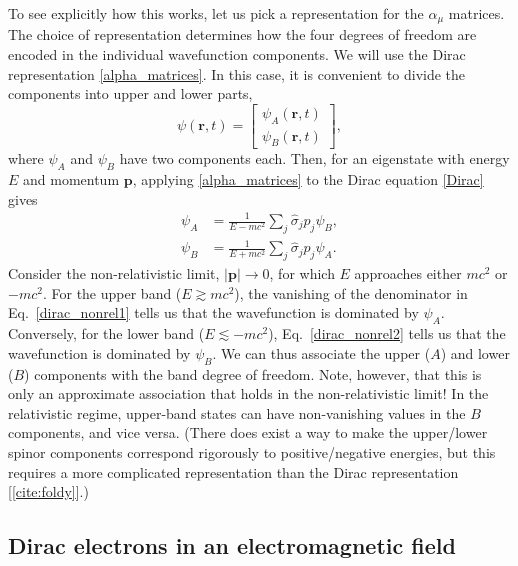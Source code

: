\documentclass[pra,12pt]{revtex4}
\begin{document}
To see explicitly how this works, let us pick a representation for the
$\hat{\alpha}_\mu$ matrices.  The choice of representation determines
how the four degrees of freedom are encoded in the individual
wavefunction components.  We will use the Dirac representation
\eqref{alpha_matrices}.  In this case, it is convenient to divide the
components into upper and lower parts,
\begin{equation}
  \psi(\mathbf{r},t) = \begin{bmatrix}\psi_A(\mathbf{r},t)
    \\ \psi_B(\mathbf{r},t)
  \end{bmatrix},
\end{equation}
where $\psi_A$ and $\psi_B$ have two components each.  Then, for an
eigenstate with energy $E$ and momentum $\mathbf{p}$, applying
\eqref{alpha_matrices} to the Dirac equation \eqref{Dirac} gives
\begin{align}
  \psi_A &= \frac{1}{E - mc^2} \sum_j \hat{\sigma}_j p_j \psi_B,
  \label{dirac_nonrel1} \\
  \psi_B &= \frac{1}{E + mc^2} \sum_j \hat{\sigma}_j p_j \psi_A.
  \label{dirac_nonrel2}
\end{align}
Consider the non-relativistic limit, $|\mathbf{p}| \rightarrow 0$, for
which $E$ approaches either $mc^2$ or $-mc^2$.  For the upper band ($E
\gtrsim mc^2$), the vanishing of the denominator in
Eq.~\eqref{dirac_nonrel1} tells us that the wavefunction is dominated
by $\psi_A$.  Conversely, for the lower band ($E \lesssim -mc^2$),
Eq.~\eqref{dirac_nonrel2} tells us that the wavefunction is dominated
by $\psi_B$.  We can thus associate the upper ($A$) and lower ($B$)
components with the band degree of freedom.  Note, however, that this
is only an approximate association that holds in the non-relativistic
limit!  In the relativistic regime, upper-band states can have
non-vanishing values in the $B$ components, and vice versa.  (There
does exist a way to make the upper/lower spinor components correspond
rigorously to positive/negative energies, but this requires a more
complicated representation than the Dirac representation
[\ref{cite:foldy}].)

\subsection{Dirac electrons in an electromagnetic field}
\label{sec:diracem}
\end{document}
